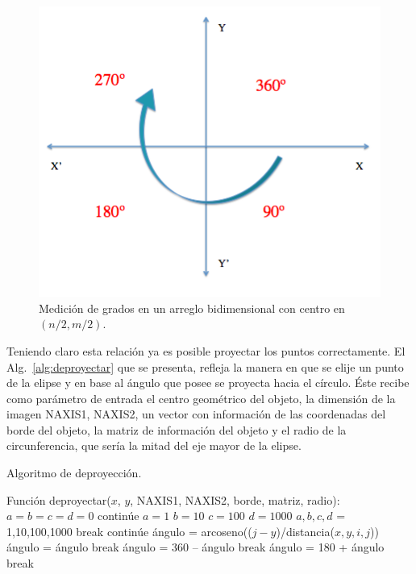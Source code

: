 \begin{figure}[hb!]
  \begin{center}
    \includegraphics[scale=.5]{image/planoHorario}
  \end{center}
  \caption{Medición de grados en un arreglo bidimensional con centro
  en $(n/2,m/2)$.}\label{img:planoHorario}
\end{figure}

Teniendo claro esta relación ya es posible proyectar los puntos
correctamente. El Alg.~\ref{alg:deproyectar} que se presenta, refleja
la manera en que se elije un punto de la elipse y en base al ángulo
que posee se proyecta hacia el círculo. Éste recibe como parámetro de
entrada el centro geométrico del objeto, la dimensión de la imagen
NAXIS1, NAXIS2, un vector con información de las coordenadas del borde
del objeto, la matriz de información del objeto y el radio de la
circunferencia, que sería la mitad del eje mayor de la elipse.

\begin{algorithm}
\caption{Algoritmo de deproyección.}
\label{alg:deproyectar}
\begin{algorithmic}[1]
\STATE Función deproyectar($x$, $y$, NAXIS1, NAXIS2, borde, matriz, radio):
\STATE $a = b = c = d = 0$
\STATE continúe
\ENDIF
{}
\STATE $a = 1$
\ENDIF
{}
\STATE $b = 10$
\ENDIF
{}
\STATE $c = 100$
\ENDIF
{}
\STATE $d = 1000$
\ENDIF
{}
\STATE $a,b,c,d$ = 1,10,100,1000
\STATE break
\ENDIF
\ENDWHILE
{}
\STATE continúe
\ENDIF
\STATE ángulo = arcoseno(($j - y$)/distancia($x,y,i,j$))
\STATE ángulo = ángulo
\STATE break
\ENDIF
{}
\STATE ángulo = 360 – ángulo
\STATE break
\ENDIF
{}
\STATE ángulo = 180 + ángulo
\STATE break
\ENDIF
{}
\end{algorithmic}
\end{algorithm}


